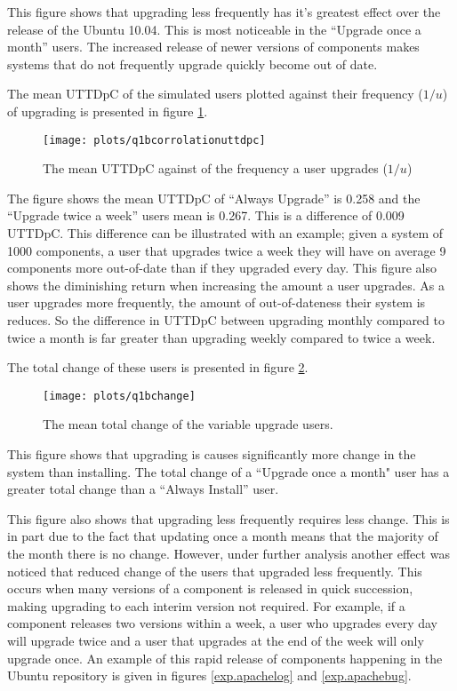 This figure shows that upgrading less frequently has it's greatest effect over the release of the Ubuntu 10.04.
This is most noticeable in the ``Upgrade once a month'' users.
The increased release of newer versions of components makes systems that do not frequently upgrade quickly become out of date.

The mean UTTDpC of the simulated users plotted against their frequency ($1/u$) of upgrading is presented in figure \ref{exp.q1bcorrolationuttdpc}.
\begin{figure}[htp]
\begin{center}
  \texttt{[image: plots/q1bcorrolationuttdpc]}
  \caption{The mean UTTDpC against of the frequency a user upgrades ($1/u$)}
  \label{exp.q1bcorrolationuttdpc}
\end{center}
\end{figure}

The figure shows the mean UTTDpC of ``Always Upgrade'' is 0.258 and the ``Upgrade twice a week'' users mean is 0.267.
This is a difference of 0.009 UTTDpC.
This difference can be illustrated with an example; given a system of 1000 components, 
a user that upgrades twice a week they will have on average 9 components more out-of-date than if they upgraded every day. 
This figure also shows the diminishing return when increasing the amount a user upgrades.
As a user upgrades more frequently, the amount of out-of-dateness their system is reduces.
So the difference in UTTDpC between upgrading monthly compared to twice a month is far greater than upgrading weekly compared to twice a week.

The total change of these users is presented in figure \ref{exp.q1bchange}.
\begin{figure}[htp]
\begin{center}
  \texttt{[image: plots/q1bchange]}
  \caption{The mean total change of the variable upgrade users.}
  \label{exp.q1bchange}
\end{center}
\end{figure}
This figure shows that upgrading is causes significantly more change in the system than installing.
The total change of a ``Upgrade once a month" user has a greater total change than a ``Always Install'' user.

This figure also shows that upgrading less frequently requires less change. 
This is in part due to the fact that updating once a month means that the majority of the month there is no change.
However, under further analysis another effect was noticed that reduced change of the users that upgraded less frequently.
This occurs when many versions of a component is released in quick succession, making upgrading to each interim version not required.
For example, if a component releases two versions within a week, a user who upgrades every day will upgrade twice and a user that upgrades at the end of the week will only upgrade once.
An example of this rapid release of components happening in the Ubuntu repository is given in figures \ref{exp.apachelog} and \ref{exp.apachebug}.

